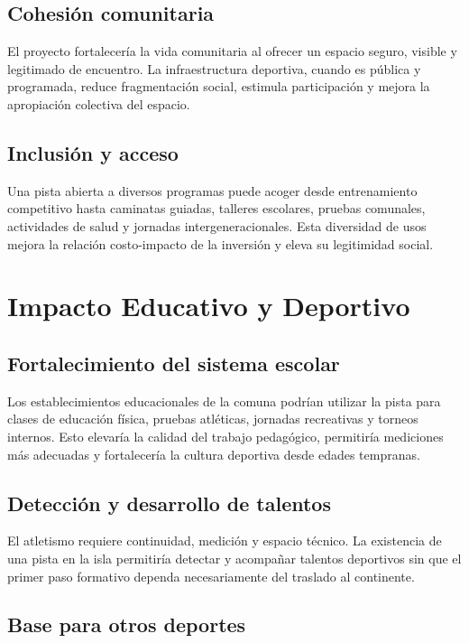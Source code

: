 \documentclass[12pt,letterpaper]{article}
\begin{document}
\subsection{Cohesión comunitaria}

El proyecto fortalecería la vida comunitaria al ofrecer un espacio seguro, visible y legitimado de encuentro. La infraestructura deportiva, cuando es pública y programada, reduce fragmentación social, estimula participación y mejora la apropiación colectiva del espacio.

\subsection{Inclusión y acceso}

Una pista abierta a diversos programas puede acoger desde entrenamiento competitivo hasta caminatas guiadas, talleres escolares, pruebas comunales, actividades de salud y jornadas intergeneracionales. Esta diversidad de usos mejora la relación costo-impacto de la inversión y eleva su legitimidad social.

\section{Impacto Educativo y Deportivo}

\subsection{Fortalecimiento del sistema escolar}

Los establecimientos educacionales de la comuna podrían utilizar la pista para clases de educación física, pruebas atléticas, jornadas recreativas y torneos internos. Esto elevaría la calidad del trabajo pedagógico, permitiría mediciones más adecuadas y fortalecería la cultura deportiva desde edades tempranas.

\subsection{Detección y desarrollo de talentos}

El atletismo requiere continuidad, medición y espacio técnico. La existencia de una pista en la isla permitiría detectar y acompañar talentos deportivos sin que el primer paso formativo dependa necesariamente del traslado al continente.

\subsection{Base para otros deportes}
\end{document}
